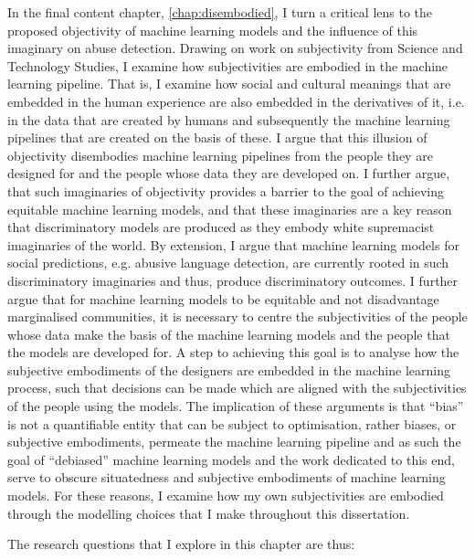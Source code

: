 In the final content chapter, \cref{chap:disembodied}, I turn a critical lens to the proposed objectivity of machine learning models and the influence of this imaginary on abuse detection.
Drawing on work on subjectivity from Science and Technology Studies, I examine how subjectivities are embodied in the machine learning pipeline.
That is, I examine how social and cultural meanings that are embedded in the human experience are also embedded in the derivatives of it, i.e. in the data that are created by humans and subsequently the machine learning pipelines that are created on the basis of these.
I argue that this illusion of objectivity \citep{Haraway:1988} disembodies machine learning pipelines from the people they are designed for and the people whose data they are developed on.
I further argue, that such imaginaries of objectivity provides a barrier to the goal of achieving equitable machine learning models, and that these imaginaries are a key reason that discriminatory models are produced as they embody white supremacist imaginaries of the world.
By extension, I argue that machine learning models for social predictions, e.g. abusive language detection, are currently rooted in such discriminatory imaginaries and thus, produce discriminatory outcomes.
I further argue that for machine learning models to be equitable and not disadvantage marginalised communities, it is necessary to centre the subjectivities of the people whose data make the basis of the machine learning models and the people that the models are developed for.
A step to achieving this goal is to analyse how the subjective embodiments of the designers are embedded in the machine learning process, such that decisions can be made which are aligned with the subjectivities of the people using the models.
The implication of these arguments is that ``bias'' is not a quantifiable entity that can be subject to optimisation, rather biases, or subjective embodiments, permeate the machine learning pipeline and as such the goal of ``debiased'' machine learning models and the work dedicated to this end, serve to obscure situatedness and subjective embodiments of machine learning models.
For these reasons, I examine how my own subjectivities are embodied through the modelling choices that I make throughout this dissertation.

The research questions that I explore in this chapter are thus:

